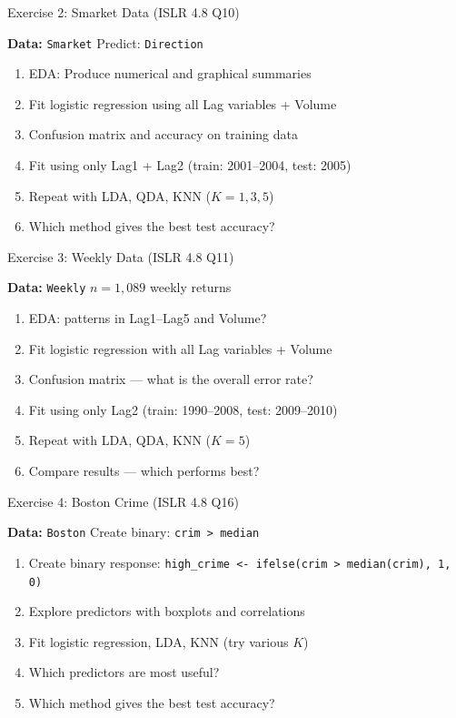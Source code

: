 \documentclass[aspectratio=169, 11pt]{beamer}
\begin{document}
\begin{frame}{Exercise 2: Smarket Data (ISLR 4.8 Q10)}

\textbf{Data:} \texttt{Smarket} \hfill Predict: \texttt{Direction}

\begin{enumerate}
  \item EDA: Produce numerical and graphical summaries
  \item Fit logistic regression using all Lag variables + Volume
  \item Confusion matrix and accuracy on training data
  \item Fit using only Lag1 + Lag2 (train: 2001--2004, test: 2005)
  \item Repeat with LDA, QDA, KNN ($K = 1, 3, 5$)
  \item Which method gives the best test accuracy?
\end{enumerate}

\vspace{0.3em}
\end{frame}


\begin{frame}{Exercise 3: Weekly Data (ISLR 4.8 Q11)}

\textbf{Data:} \texttt{Weekly} \hfill $n = 1{,}089$ weekly returns

\begin{enumerate}
  \item EDA: patterns in Lag1--Lag5 and Volume?
  \item Fit logistic regression with all Lag variables + Volume
  \item Confusion matrix --- what is the overall error rate?
  \item Fit using only Lag2 (train: 1990--2008, test: 2009--2010)
  \item Repeat with LDA, QDA, KNN ($K = 5$)
  \item Compare results --- which performs best?
\end{enumerate}
\end{frame}


\begin{frame}{Exercise 4: Boston Crime (ISLR 4.8 Q16)}

\textbf{Data:} \texttt{Boston} \hfill Create binary: \texttt{crim > median}

\begin{enumerate}
  \item Create binary response: \texttt{high\_crime <- ifelse(crim > median(crim), 1, 0)}
  \item Explore predictors with boxplots and correlations
  \item Fit logistic regression, LDA, KNN (try various $K$)
  \item Which predictors are most useful?
  \item Which method gives the best test accuracy?
\end{enumerate}

\vspace{0.3em}
\end{frame}
\end{document}
